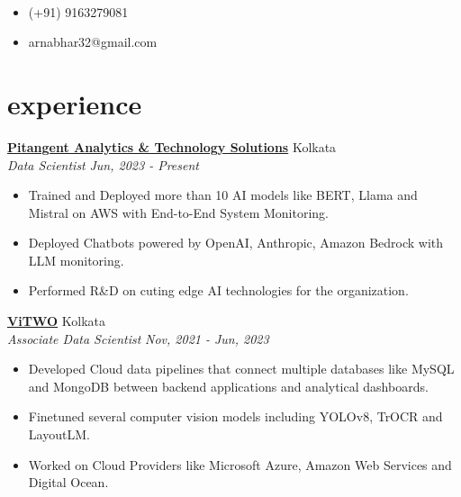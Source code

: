 \documentclass[12pt]{article}
\newcommand{\heading}[2]{\centering{\sffamily\Huge #1}\\\smallskip{\large{#2}}}
\newcommand{\entry}[4]{{{\textbf{#1}}} \hfill #3 \\ #2 \hfill #4}
\begin{document}
\begin{paracol}{2}

\heading{Arnab Dhar}
\switchcolumn

\begin{itemize}[itemsep=1pt,label={}]
  \item (+91) 9163279081
  \item arnabhar32@gmail.com
\end{itemize}

\switchcolumn*



\section{experience}

\entry{\href{https://in.linkedin.com/company/pitangent}{Pitangent Analytics \& Technology Solutions}}{\emph{Data Scientist}}{Kolkata}{\emph{Jun, 2023 - Present}}
\begin{itemize}
    \item Trained and Deployed more than 10 AI models like BERT, Llama and Mistral on AWS with End-to-End System Monitoring.
    \item Deployed Chatbots powered by OpenAI, Anthropic, Amazon Bedrock with LLM monitoring.
    \item Performed R\&D on cuting edge AI technologies for the organization. 
\end{itemize}


\medskip

\entry{\href{https://www.linkedin.com/company/vitwo}{ViTWO}}{\emph{Associate Data Scientist}}{Kolkata}{\emph{Nov, 2021 - Jun, 2023}}
\begin{itemize}
  \item Developed Cloud data pipelines that connect multiple databases like MySQL and MongoDB between backend applications and analytical dashboards.
  \item Finetuned several computer vision models including YOLOv8, TrOCR and LayoutLM.
  \item Worked on Cloud Providers like Microsoft Azure, Amazon Web Services and Digital Ocean.
\end{itemize}



\switchcolumn


\end{paracol}
\end{document}
